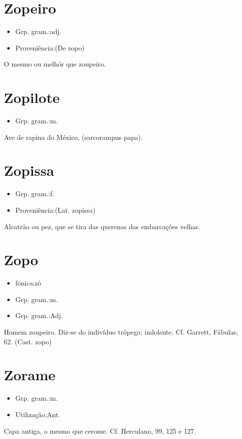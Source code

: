\section{Zopeiro}
\begin{itemize}
\item {Grp. gram.:adj.}
\end{itemize}
\begin{itemize}
\item {Proveniência:(De \textunderscore zopo\textunderscore )}
\end{itemize}
O mesmo ou melhór que \textunderscore zoupeiro\textunderscore .
\section{Zopilote}
\begin{itemize}
\item {Grp. gram.:m.}
\end{itemize}
Ave de rapina do México, (\textunderscore sarcorampus papa\textunderscore ).
\section{Zopissa}
\begin{itemize}
\item {Grp. gram.:f.}
\end{itemize}
\begin{itemize}
\item {Proveniência:(Lat. \textunderscore zopissa\textunderscore )}
\end{itemize}
Alcatrão ou pez, que se tira das querenas das embarcações velhas.
\section{Zopo}
\begin{itemize}
\item {fónica:zô}
\end{itemize}
\begin{itemize}
\item {Grp. gram.:m.}
\end{itemize}
\begin{itemize}
\item {Grp. gram.:Adj.}
\end{itemize}
Homem zoupeiro.
Diz-se do indivíduo trôpego; indolente. Cf. Garrett, \textunderscore Fábulas\textunderscore , 62.
(Cast. \textunderscore zopo\textunderscore )
\section{Zorame}
\begin{itemize}
\item {Grp. gram.:m.}
\end{itemize}
\begin{itemize}
\item {Utilização:Ant.}
\end{itemize}
Capa antiga, o mesmo que \textunderscore cerome\textunderscore . Cf. Herculano, 99, 125 e 127.
